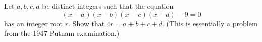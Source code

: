 Let $a, b, c, d$ be distinct integers such that the equation
$$ (x - a)(x - b)(x - c)(x - d) - 9 = 0 $$
has an integer root $r$. Show that $4r = a + b + c + d$. (This is essentially a
problem from the 1947 Putnam examination.)
